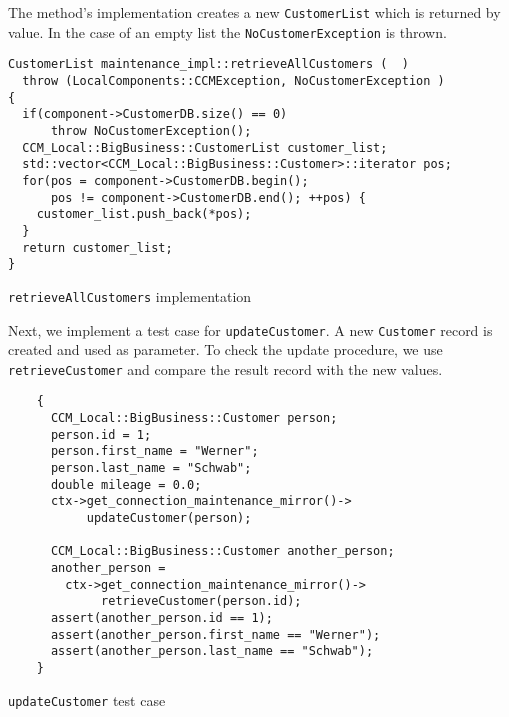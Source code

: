 \newpage
The method's implementation creates a new {\tt CustomerList} which
is returned by value.
In the case of an empty list the {\tt NoCustomerException} is thrown.

\begin{Example}
\begin{minifbox}
\begin{small}
\begin{verbatim}
CustomerList maintenance_impl::retrieveAllCustomers (  )
  throw (LocalComponents::CCMException, NoCustomerException )
{
  if(component->CustomerDB.size() == 0)
      throw NoCustomerException();
  CCM_Local::BigBusiness::CustomerList customer_list;
  std::vector<CCM_Local::BigBusiness::Customer>::iterator pos;
  for(pos = component->CustomerDB.begin(); 
      pos != component->CustomerDB.end(); ++pos) {
    customer_list.push_back(*pos);
  }
  return customer_list;
}
\end{verbatim}
\end{small}
\end{minifbox}
\caption{{\tt retrieveAllCustomers} implementation }
\label{example:retrieveAllCustomersImpl}
\end{Example}


Next, we implement a test case for {\tt updateCustomer}.
A new {\tt Customer} record is created and used as parameter.
To check the update procedure, we use {\tt retrieveCustomer} 
and compare the result record with the new values.
\begin{Example}
\begin{minifbox}
\begin{small}
\begin{verbatim}
    {
      CCM_Local::BigBusiness::Customer person;
      person.id = 1;
      person.first_name = "Werner";
      person.last_name = "Schwab";
      double mileage = 0.0;
      ctx->get_connection_maintenance_mirror()->
           updateCustomer(person);      

      CCM_Local::BigBusiness::Customer another_person;
      another_person = 
        ctx->get_connection_maintenance_mirror()->
             retrieveCustomer(person.id);
      assert(another_person.id == 1);
      assert(another_person.first_name == "Werner");
      assert(another_person.last_name == "Schwab");
    }
\end{verbatim}
\end{small}
\end{minifbox}
\caption{{\tt updateCustomer} test case}
\label{example:}
\end{Example}


